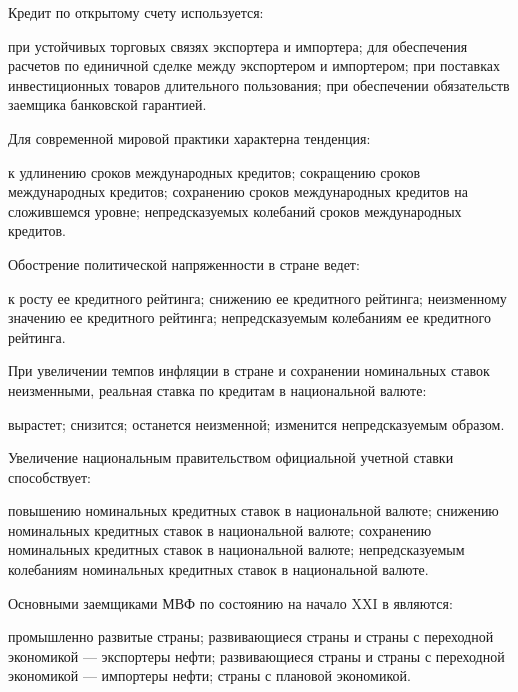 \documentclass[12pt, table]{exam}
\begin{document}
\begin{questions}
\begin{multicols}{2}
\begin{choices}
	 \end{choices}
\question Кредит по открытому счету используется:
	 \begin{choices}
	 \CC при устойчивых торговых связях экспортера и импортера;
	 \choice для обеспечения расчетов по единичной сделке между экспортером и импортером;
	 \choice при поставках инвестиционных товаров длительного пользования;
	 \choice при обеспечении обязательств заемщика банковской гарантией.
	 \end{choices}
\question Для современной мировой практики характерна тенденция:
	 \begin{choices}
	 \CC к удлинению сроков международных кредитов;
	 \choice сокращению сроков международных кредитов;
	 \choice сохранению сроков международных кредитов на сложившемся уровне;
	 \choice непредсказуемых колебаний сроков международных кредитов.
	 \end{choices}
\question Обострение политической напряженности в стране ведет:
	 \begin{choices}
	 \choice к росту ее кредитного рейтинга;
	 \CC снижению ее кредитного рейтинга;
	 \choice неизменному значению ее кредитного рейтинга;
	 \choice непредсказуемым колебаниям ее кредитного рейтинга.
	 \end{choices}
\question При увеличении темпов инфляции в стране и сохранении номинальных ставок неизменными, реальная ставка по кредитам в национальной валюте:
	 \begin{choices}
	 \choice вырастет;
	 \CC снизится;
	 \choice останется неизменной;
	 \choice изменится непредсказуемым образом.
	 \end{choices}
\question Увеличение национальным правительством официальной учетной ставки способствует:
	 \begin{choices}
	 \CC повышению номинальных кредитных ставок в национальной валюте;
	 \choice снижению номинальных кредитных ставок в национальной валюте;
	 \choice сохранению номинальных кредитных ставок в национальной валюте;
	 \choice непредсказуемым колебаниям номинальных кредитных ставок в национальной валюте.
	 \end{choices}
\question Основными заемщиками МВФ по состоянию на начало XXI в являются:
	 \begin{choices}
	 \choice промышленно развитые страны;
	 \choice развивающиеся страны и страны с переходной экономикой — экспортеры нефти;
	 \CC развивающиеся страны и страны с переходной экономикой — импортеры нефти;
	 \choice страны с плановой экономикой.
	 \end{choices}

\end{multicols}
\end{questions}
\end{document}
